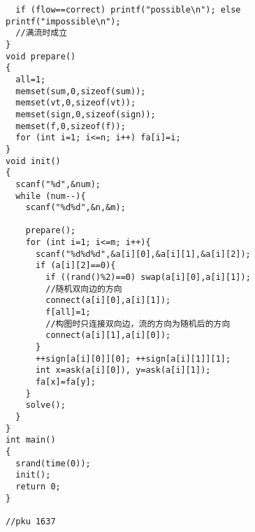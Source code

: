 \begin{verbatim}
  if (flow==correct) printf("possible\n"); else printf("impossible\n");
  //满流时成立
}
void prepare()
{
  all=1;
  memset(sum,0,sizeof(sum));
  memset(vt,0,sizeof(vt));
  memset(sign,0,sizeof(sign));
  memset(f,0,sizeof(f));
  for (int i=1; i<=n; i++) fa[i]=i;
}
void init()
{
  scanf("%d",&num);
  while (num--){
    scanf("%d%d",&n,&m);

    prepare();
    for (int i=1; i<=m; i++){
      scanf("%d%d%d",&a[i][0],&a[i][1],&a[i][2]);
      if (a[i][2]==0){
        if ((rand()%2)==0) swap(a[i][0],a[i][1]);
        //随机双向边的方向
        connect(a[i][0],a[i][1]);
        f[all]=1;
        //构图时只连接双向边，流的方向为随机后的方向
        connect(a[i][1],a[i][0]);
      }
      ++sign[a[i][0]][0]; ++sign[a[i][1]][1];
      int x=ask(a[i][0]), y=ask(a[i][1]);
      fa[x]=fa[y];
    }
    solve();
  }
}
int main()
{
  srand(time(0));
  init();
  return 0;
}

//pku 1637

\end{verbatim} 
